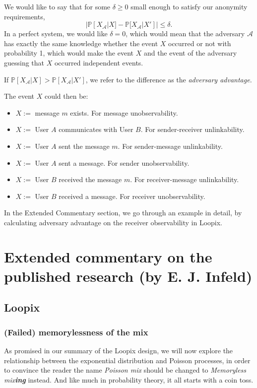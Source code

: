 \documentclass{article}
\begin{document}
\noindent We would like to say that for some $\delta\geq 0$ small enough to satisfy our anonymity requirements, $$|\mathbb{P}[X_\mathcal{A}|X]-\mathbb{P}[X_\mathcal{A}|X']|\leq \delta.$$ In a perfect system, we would like $\delta=0$, which would mean that the adversary $\mathcal{A}$ has exactly the same knowledge whether the event $X$ occurred or not with probability 1, which would make the event $X$ and the event of the adversary guessing that $X$ occurred independent events. \medskip

\noindent If $\mathbb{P}[X_\mathcal{A}|X]>\mathbb{P}[X_\mathcal{A}|X']$, we refer to the difference as the \textit{adversary advantage.}\medskip

\noindent The event $X$ could then be:
\begin{itemize}
    \item $X:=$ message $m$ exists. For message unobservability.
    \item $X:=$ User $A$ communicates with User $B$. For sender-receiver unlinkability.
    \item $X:=$ User $A$ sent the message $m.$ For sender-message unlinkability.
    \item $X:=$ User $A$ sent a message. For sender unobservability.
    \item $X:=$ User $B$ received the message $m.$ For receiver-message unlinkability.
    \item $X:=$ User $B$ received a message. For receiver unobservability.
\end{itemize}\medskip

\noindent In the Extended Commentary section, we go through an example in detail, by calculating adversary advantage on the receiver observability in Loopix. 

\pagebreak

\newpage
\section{Extended commentary on the published research (by E. J. Infeld)}

\subsection{Loopix}
\subsubsection{(Failed) memorylessness of the mix}
As promised in our summary of the Loopix design, we will now explore the relationship between the exponential distribution and Poisson processes, in order to convince the reader the name \textit{Poisson mix} should be changed to \textit{Memoryless mix\textbf{ing}} instead. And like much in probability theory, it all starts with a coin toss.\medskip
\end{document}

